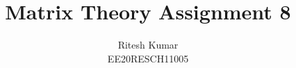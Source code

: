 \documentclass[journal,12pt,twocolumn]{IEEEtran}
\DeclareMathOperator*{\Res}{Res}
\begin{document}
	
	
	\newtheorem{theorem}{Theorem}[section]
	\newtheorem{problem}{Problem}
	\newtheorem{proposition}{Proposition}[section]
	\newtheorem{lemma}{Lemma}[section]
	\newtheorem{corollary}[theorem]{Corollary}
	\newtheorem{example}{Example}[section]
	\newtheorem{definition}[problem]{Definition}
	
	\newcommand{\BEQA}{\begin{eqnarray}}
	\newcommand{\EEQA}{\end{eqnarray}}
	\newcommand{\define}{\stackrel{\triangle}{=}}
	
	\providecommand{\mbf}{\mathbf}
	\providecommand{\pr}[1]{\ensuremath{\Pr\left(#1\right)}}
	\providecommand{\qfunc}[1]{\ensuremath{Q\left(#1\right)}}
	\providecommand{\sbrak}[1]{\ensuremath{{}\left[#1\right]}}
	\providecommand{\lsbrak}[1]{\ensuremath{{}\left[#1\right.}}
	\providecommand{\rsbrak}[1]{\ensuremath{{}\left.#1\right]}}
	\providecommand{\brak}[1]{\ensuremath{\left(#1\right)}}
	\providecommand{\lbrak}[1]{\ensuremath{\left(#1\right.}}
	\providecommand{\rbrak}[1]{\ensuremath{\left.#1\right)}}
	\providecommand{\cbrak}[1]{\ensuremath{\left\{#1\right\}}}
	\providecommand{\lcbrak}[1]{\ensuremath{\left\{#1\right.}}
	\providecommand{\rcbrak}[1]{\ensuremath{\left.#1\right\}}}
	\theoremstyle{remark}
	\newtheorem{rem}{Remark}
	\newcommand{\sgn}{\mathop{\mathrm{sgn}}}
	\providecommand{\abs}[1]{\left\vert#1\right\vert}
	\providecommand{\res}[1]{\Res\displaylimits_{#1}} 
	\providecommand{\norm}[1]{\left\lVert#1\right\rVert}
	\providecommand{\mtx}[1]{\mathbf{#1}}
	\providecommand{\mean}[1]{E\left[ #1 \right]}
	\providecommand{\fourier}{\overset{\mathcal{F}}{ \rightleftharpoons}}
	\providecommand{\system}{\overset{\mathcal{H}}{ \longleftrightarrow}}
	\newcommand{\solution}{\noindent \textbf{Solution: }}
	\newcommand{\cosec}{\,\text{cosec}\,}
	\providecommand{\dec}[2]{\ensuremath{\overset{#1}{\underset{#2}{\gtrless}}}}
	\newcommand{\myvec}[1]{\ensuremath{\begin{pmatrix}#1\end{pmatrix}}}
	\newcommand{\mydet}[1]{\ensuremath{\begin{vmatrix}#1\end{vmatrix}}}
	\makeatletter
	\makeatother
	\let\StandardTheFigure\thefigure
	\let\vec\mathbf
	\renewcommand{\thefigure}{\theproblem}
	\def\putbox#1#2#3{\makebox[0in][l]{\makebox[#1][l]{}\raisebox{\baselineskip}[0in][0in]{\raisebox{#2}[0in][0in]{#3}}}}
	\def\rightbox#1{\makebox[0in][r]{#1}}
	\def\centbox#1{\makebox[0in]{#1}}
	\def\topbox#1{\raisebox{-\baselineskip}[0in][0in]{#1}}
	\def\midbox#1{\raisebox{-0.5\baselineskip}[0in][0in]{#1}}
	\vspace{3cm}
	\title{Matrix Theory Assignment 8}
	\author{Ritesh Kumar \\ EE20RESCH11005}
	
\end{document}
